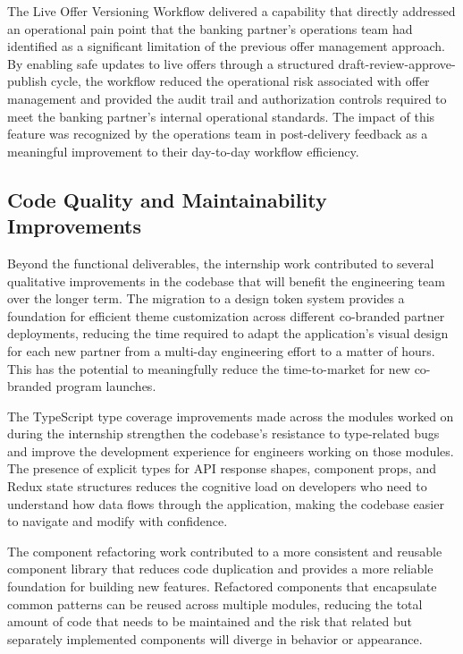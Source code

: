 The Live Offer Versioning Workflow delivered a capability that directly addressed an operational pain point that the banking partner's operations team had identified as a significant limitation of the previous offer management approach. By enabling safe updates to live offers through a structured draft-review-approve-publish cycle, the workflow reduced the operational risk associated with offer management and provided the audit trail and authorization controls required to meet the banking partner's internal operational standards. The impact of this feature was recognized by the operations team in post-delivery feedback as a meaningful improvement to their day-to-day workflow efficiency.

\subsection{Code Quality and Maintainability Improvements}

Beyond the functional deliverables, the internship work contributed to several qualitative improvements in the codebase that will benefit the engineering team over the longer term. The migration to a design token system provides a foundation for efficient theme customization across different co-branded partner deployments, reducing the time required to adapt the application's visual design for each new partner from a multi-day engineering effort to a matter of hours. This has the potential to meaningfully reduce the time-to-market for new co-branded program launches.

The TypeScript type coverage improvements made across the modules worked on during the internship strengthen the codebase's resistance to type-related bugs and improve the development experience for engineers working on those modules. The presence of explicit types for API response shapes, component props, and Redux state structures reduces the cognitive load on developers who need to understand how data flows through the application, making the codebase easier to navigate and modify with confidence.

The component refactoring work contributed to a more consistent and reusable component library that reduces code duplication and provides a more reliable foundation for building new features. Refactored components that encapsulate common patterns can be reused across multiple modules, reducing the total amount of code that needs to be maintained and the risk that related but separately implemented components will diverge in behavior or appearance.


